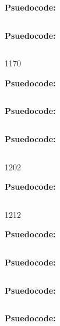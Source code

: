 
\textbf{Psuedocode:}
\begin{verbatim}
\end{verbatim}



\textbf{Psuedocode:}
\begin{verbatim}
\end{verbatim}


   {117}{0}

\textbf{Psuedocode:}
\begin{verbatim}
\end{verbatim}



\textbf{Psuedocode:}
\begin{verbatim}
\end{verbatim}



\textbf{Psuedocode:}
\begin{verbatim}
\end{verbatim}


  {120}{2}

\textbf{Psuedocode:}
\begin{verbatim}
\end{verbatim}


  {121}{2}

\textbf{Psuedocode:}
\begin{verbatim}
\end{verbatim}



\textbf{Psuedocode:}
\begin{verbatim}
\end{verbatim}



\textbf{Psuedocode:}
\begin{verbatim}
\end{verbatim}



\textbf{Psuedocode:}
\begin{verbatim}
\end{verbatim}


